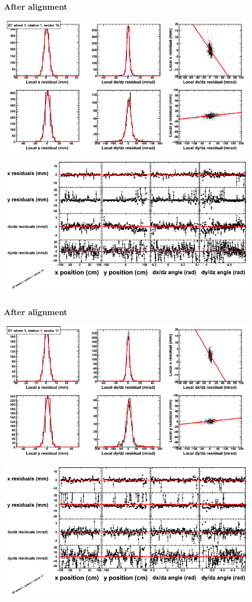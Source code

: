 \documentclass[compress]{beamer}
\begin{document}
\begin{frame}
\frametitle{After alignment}
\includegraphics[width=0.7\linewidth]{NOV4_fitfunctions/MBwhDst1sec10_bellcurves.png}

\includegraphics[width=0.7\linewidth]{NOV4_fitfunctions/MBwhDst1sec10_polynomials.png}
\end{frame}

\begin{frame}
\frametitle{After alignment}
\includegraphics[width=0.7\linewidth]{NOV4_fitfunctions/MBwhDst1sec11_bellcurves.png}

\includegraphics[width=0.7\linewidth]{NOV4_fitfunctions/MBwhDst1sec11_polynomials.png}
\end{frame}
\end{document}

